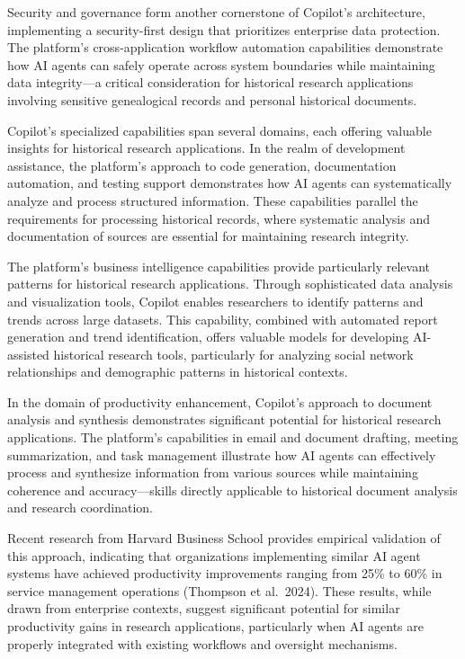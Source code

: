 \documentclass[
]{article}
\begin{document}
Security and governance form another cornerstone of Copilot's
architecture, implementing a security-first design that prioritizes
enterprise data protection. The platform's cross-application workflow
automation capabilities demonstrate how AI agents can safely operate
across system boundaries while maintaining data integrity---a critical
consideration for historical research applications involving sensitive
genealogical records and personal historical documents.

Copilot's specialized capabilities span several domains, each offering
valuable insights for historical research applications. In the realm of
development assistance, the platform's approach to code generation,
documentation automation, and testing support demonstrates how AI agents
can systematically analyze and process structured information. These
capabilities parallel the requirements for processing historical
records, where systematic analysis and documentation of sources are
essential for maintaining research integrity.

The platform's business intelligence capabilities provide particularly
relevant patterns for historical research applications. Through
sophisticated data analysis and visualization tools, Copilot enables
researchers to identify patterns and trends across large datasets. This
capability, combined with automated report generation and trend
identification, offers valuable models for developing AI-assisted
historical research tools, particularly for analyzing social network
relationships and demographic patterns in historical contexts.

In the domain of productivity enhancement, Copilot's approach to
document analysis and synthesis demonstrates significant potential for
historical research applications. The platform's capabilities in email
and document drafting, meeting summarization, and task management
illustrate how AI agents can effectively process and synthesize
information from various sources while maintaining coherence and
accuracy---skills directly applicable to historical document analysis
and research coordination.

Recent research from Harvard Business School provides empirical
validation of this approach, indicating that organizations implementing
similar AI agent systems have achieved productivity improvements ranging
from 25\% to 60\% in service management operations (Thompson et
al.~2024). These results, while drawn from enterprise contexts, suggest
significant potential for similar productivity gains in research
applications, particularly when AI agents are properly integrated with
existing workflows and oversight mechanisms.
\end{document}
